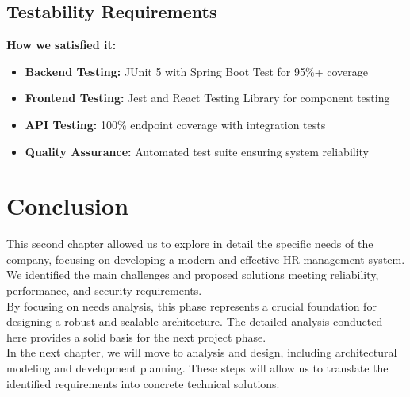 \documentclass[a4paper,12pt]{report}
\begin{document}
\subsection{Testability Requirements}
\textbf{How we satisfied it:}
\begin{itemize}
    \item \textbf{Backend Testing:} JUnit 5 with Spring Boot Test for 95\%+ coverage
    \item \textbf{Frontend Testing:} Jest and React Testing Library for component testing
    \item \textbf{API Testing:} 100\% endpoint coverage with integration tests
    \item \textbf{Quality Assurance:} Automated test suite ensuring system reliability
\end{itemize}

\section{Conclusion}
\begin{doublespace}
\hspace{1cm}This second chapter allowed us to explore in detail the specific needs of the company, focusing on developing a modern and effective HR management system. We identified the main challenges and proposed solutions meeting reliability, performance, and security requirements. \\

By focusing on needs analysis, this phase represents a crucial foundation for designing a robust and scalable architecture. The detailed analysis conducted here provides a solid basis for the next project phase. \\

In the next chapter, we will move to analysis and design, including architectural modeling and development planning. These steps will allow us to translate the identified requirements into concrete technical solutions. 
\end{doublespace}
\newpage

\cleardoublepage
\renewcommand{\headrulewidth}{1pt}
\fancyhead[R]{\hspace*{4cm}}
\end{document}
